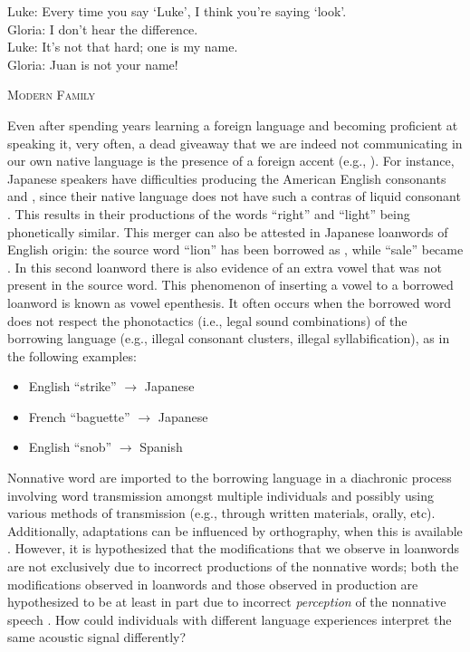 
\setlength{\epigraphwidth}{0.7\textwidth}
\epigraph{Luke: Every time you say `Luke', I think you're saying `look'. \\ Gloria: I don't hear the difference. \\ Luke: It's not that hard; one is my name. \\ Gloria: Juan is not your name!}{\textsc{Modern Family}}

Even after spending years learning a foreign language and becoming proficient at speaking it, very often, a dead giveaway that we are indeed not communicating in our own native language is the presence of a foreign accent (e.g., \cite{flege1995factors, munro1996}). For instance, Japanese speakers have difficulties producing the American English consonants  and , since their native language does not have such a contras of liquid consonant \cite{flege1995rl}. This results in their productions of the words ``right'' and ``light'' being phonetically similar. This merger can also be attested in Japanese loanwords of English origin: the source word ``lion'' has been borrowed as , while ``sale'' became . In this second loanword there is also evidence of an extra  vowel that was not present in the source word. This phenomenon of inserting a vowel to a borrowed loanword is known as vowel epenthesis. It often occurs when the borrowed word does not respect the phonotactics (i.e., legal sound combinations) of the borrowing language (e.g., illegal consonant clusters, illegal syllabification), as in the following examples:
\begin{itemize}
  \item English ``strike''  $\rightarrow$ Japanese 
  \item French ``baguette''  $\rightarrow$ Japanese  %
  \item English ``snob''  $\rightarrow$ Spanish 
  \end{itemize}

Nonnative word are imported to the borrowing language in a diachronic process involving word transmission amongst multiple individuals and possibly using various methods of transmission (e.g., through written materials, orally, etc). Additionally, adaptations can be influenced by orthography, when this is available \cite{daland2015,vendelin2006}. However, it is hypothesized that the modifications that we observe in loanwords are not exclusively due to incorrect productions of the nonnative words; both the modifications observed in loanwords and those observed in production are hypothesized to be at least in part due to incorrect \textit{perception} of the nonnative speech \cite{peperkamp2003, peperkamp2005, peperkamp2008, wilson2013,wilson2014}.  How could individuals with different language experiences interpret the same acoustic signal differently?

